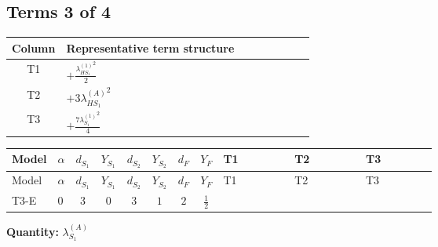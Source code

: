 \documentclass[8pt]{article}
\begin{document}
\begin{landscape}
\subsection*{Terms 3 of 4}
\begin{center}
\begin{tabular}{@{}c >{\raggedright\arraybackslash}p{0.82\linewidth}@{}}
\toprule
Column & Representative term structure \\
\midrule
T1 & \(\displaystyle +\frac{{\lambda_{HS_1}^{(1)}}^2}{2}\) \\
\midrule
T2 & \(\displaystyle +3 {\lambda_{HS_1}^{(A)}}^2\) \\
\midrule
T3 & \(\displaystyle +\frac{7 {\lambda_{S_1}^{(1)}}^2}{4}\) \\
\midrule
\bottomrule
\end{tabular}
\end{center}
\smallskip
\tiny
\begin{longtable}{@{}llcccccc >{\raggedright\arraybackslash}p{0.21\linewidth} >{\raggedright\arraybackslash}p{0.21\linewidth} >{\raggedright\arraybackslash}p{0.21\linewidth}@{}}
\toprule
Model & $\alpha$ & $d_{S_1}$ & $Y_{S_1}$ & $d_{S_2}$ & $Y_{S_2}$ & $d_F$ & $Y_F$ & T1 & T2 & T3 \\
\midrule
\endfirsthead
\toprule
Model & $\alpha$ & $d_{S_1}$ & $Y_{S_1}$ & $d_{S_2}$ & $Y_{S_2}$ & $d_F$ & $Y_F$ & T1 & T2 & T3 \\
\midrule
\endhead
T3-E & $0$ & $3$ & $0$ & $3$ & $1$ & $2$ & $\frac{1}{2}$ & \scriptsize\adjustbox{max width=\linewidth}{$\begin{gathered} +\frac{{\lambda_{HS_1}^{(1)}}^2}{2}\end{gathered}$} & \scriptsize\adjustbox{max width=\linewidth}{$\begin{gathered} +3 {\lambda_{HS_1}^{(A)}}^2\end{gathered}$} & \scriptsize\adjustbox{max width=\linewidth}{$\begin{gathered} +\frac{7 {\lambda_{S_1}^{(1)}}^2}{4}\end{gathered}$} \\
\midrule
\bottomrule
\end{longtable}
\clearpage
\noindent\textbf{Quantity: }$\lambda_{S_1}^{(A)}$\par\smallskip

\end{landscape}
\end{document}
